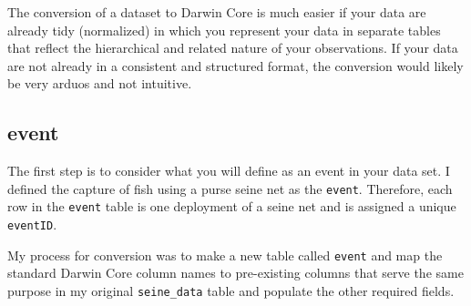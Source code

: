 \documentclass[
]{book}
\newenvironment{Shaded}{\begin{snugshade}}{\end{snugshade}}
\newcommand{\AttributeTok}[1]{\textcolor[rgb]{0.77,0.63,0.00}{#1}}
\newcommand{\CommentTok}[1]{\textcolor[rgb]{0.56,0.35,0.01}{\textit{#1}}}
\newcommand{\DecValTok}[1]{\textcolor[rgb]{0.00,0.00,0.81}{#1}}
\newcommand{\FunctionTok}[1]{\textcolor[rgb]{0.00,0.00,0.00}{#1}}
\newcommand{\NormalTok}[1]{#1}
\newcommand{\OtherTok}[1]{\textcolor[rgb]{0.56,0.35,0.01}{#1}}
\newcommand{\SpecialCharTok}[1]{\textcolor[rgb]{0.00,0.00,0.00}{#1}}
\newcommand{\StringTok}[1]{\textcolor[rgb]{0.31,0.60,0.02}{#1}}
\begin{document}
The conversion of a dataset to Darwin Core is much easier if your data are already tidy (normalized) in which you represent your data in separate tables that reflect the hierarchical and related nature of your observations. If your data are not already in a consistent and structured format, the conversion would likely be very arduos and not intuitive.

\hypertarget{event}{%
\subsection{event}\label{event}}

The first step is to consider what you will define as an event in your data set. I defined the capture of fish using a purse seine net as the \texttt{event}. Therefore, each row in the \texttt{event} table is one deployment of a seine net and is assigned a unique \texttt{eventID}.

My process for conversion was to make a new table called \texttt{event} and map the standard Darwin Core column names to pre-existing columns that serve the same purpose in my original \texttt{seine\_data} table and populate the other required fields.

\begin{Shaded}
\end{Shaded}
\end{document}
